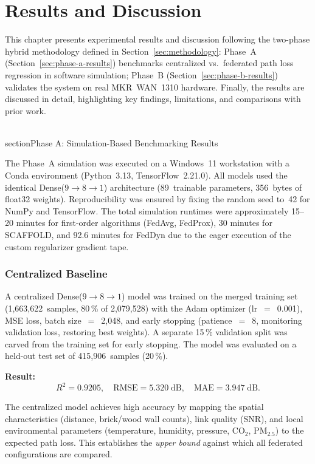 \chapter{Results and Discussion}
\label{ch:results-discussion}

This chapter presents experimental results and discussion following the two-phase hybrid
methodology defined in Section~\ref{sec:methodology}: Phase~A
(Section~\ref{sec:phase-a-results}) benchmarks centralized vs.\ federated path
loss regression in software simulation; Phase~B
(Section~\ref{sec:phase-b-results}) validates the system on real
MKR~WAN~1310 hardware. Finally, the results are discussed in detail, highlighting
key findings, limitations, and comparisons with prior work.

\\section{Phase A: Simulation-Based Benchmarking Results}
\label{sec:phase-a-results}

The Phase~A simulation was executed on a Windows~11 workstation with a Conda environment (Python~3.13, TensorFlow~2.21.0). All models used the identical Dense($9{\to}8{\to}1$) architecture (89~trainable parameters, 356~bytes of float32 weights). Reproducibility was ensured by fixing the random seed to~42 for NumPy and TensorFlow. The total simulation runtimes were approximately 15--20 minutes for first-order algorithms (FedAvg, FedProx), 30 minutes for SCAFFOLD, and 92.6 minutes for FedDyn due to the eager execution of the custom regularizer gradient tape.

\subsection{Centralized Baseline}
\label{sec:centralized-baseline}
A centralized Dense($9{\to}8{\to}1$) model was trained on the merged training set (1,663,622~samples, 80\,\% of 2,079,528) with the Adam optimizer (lr~$=$~0.001), MSE loss, batch size~$=$~2{,}048, and early stopping (patience~$=$~8, monitoring validation loss, restoring best weights). A separate 15\,\% validation split was carved from the training set for early stopping. The model was evaluated on a held-out test set of 415,906~samples (20\,\%).

\noindent\textbf{Result:}
\[
  R^2 = 0.9205, \quad
  \text{RMSE} = 5.320\;\text{dB}, \quad
  \text{MAE} = 3.947\;\text{dB}.
\]

The centralized model achieves high accuracy by mapping the spatial characteristics (distance, brick/wood wall counts), link quality (SNR), and local environmental parameters (temperature, humidity, pressure, $\text{CO}_2$, $\text{PM}_{2.5}$) to the expected path loss. This establishes the \emph{upper bound} against which all federated configurations are compared.

